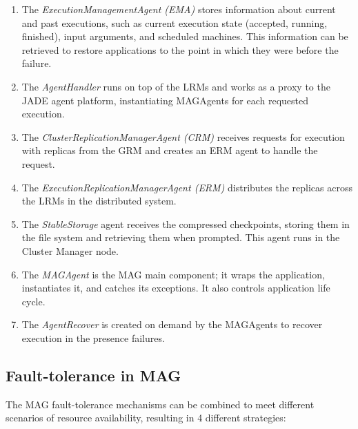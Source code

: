 \documentclass[times, 09pt, twocolumn]{article}
\begin{document}
\begin{enumerate}

    \item The \emph{ExecutionManagementAgent (EMA)}  stores
    information about current and past executions, such as current execution state
    (accepted, running, finished), input arguments, and scheduled machines. This information
    can be retrieved to restore applications to the point in which they were before
    the failure.

    \item The \emph{AgentHandler} runs on top of the LRMs and 
    works as a proxy to the JADE agent platform, instantiating
    MAGAgents for each requested execution.

    \item The \emph{ClusterReplicationManagerAgent (CRM)} receives requests
    for execution with replicas from the GRM and creates an ERM agent to handle the request.

    \item The \emph{ExecutionReplicationManagerAgent (ERM)} distributes the replicas across the 
    LRMs in the distributed system.

    \item The \emph{StableStorage} agent receives the compressed
    checkpoints, storing them in the file system and retrieving them when
    prompted. This agent runs in the Cluster Manager node.

    \item The \emph{MAGAgent} is the MAG main component; it
    wraps the application, instantiates it, and catches its exceptions. It also controls application 
    life cycle.

    \item The \emph{AgentRecover} is created on demand by the MAGAgents  to recover
    execution in the presence failures.

\end{enumerate}

\subsection{Fault-tolerance in MAG\label{sec:faulttolerance}}

The MAG fault-tolerance mechanisms can be combined to meet different scenarios of resource
availability, resulting in 4 different strategies:
\end{document}
